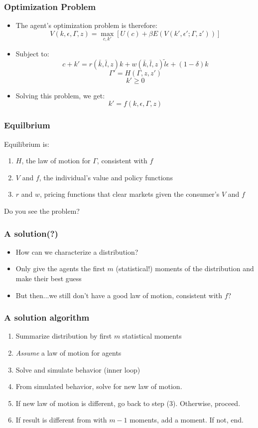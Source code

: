 \documentclass{beamer}
\begin{document}
\begin{frame}
\frametitle[alignment=center]{Optimization Problem}
\begin{itemize}
\item The agent's optimization problem is therefore:
$$V(k,\epsilon,\Gamma,z)=\underset{c,k'}{\max}\left[U(c)+\beta E(V(k',\epsilon';\Gamma,z'))\right]$$
\item Subject to:
$$c+k'=r(\bar{k},\bar{l},z)k+w(\bar{k},\bar{l},z)\tilde{l}\epsilon+(1-\delta)k$$
$$\Gamma'=H(\Gamma,z,z')$$
$$k'\geq 0$$
\item Solving this problem, we get:
$$k'=f(k,\epsilon,\Gamma,z)$$
\end{itemize}
\end{frame}

\begin{frame}
\frametitle[alignment=center]{Equilbrium}
Equilibrium is:
\begin{enumerate}
\item $H$, the law of motion for $\Gamma$, consistent with $f$
\bigskip
\item $V$ and $f$, the individual's value and policy functions
\bigskip
\item $r$ and $w$, pricing functions that clear markets given the consumer's $V$ and $f$
\end{enumerate}
Do you see the problem?
\end{frame}

\begin{frame}
\frametitle[alignment=center]{A solution(?)}
\begin{itemize}
\item How can we characterize a distribution?
\bigskip
\item Only give the agents the first $m$ (statistical!) moments of the distribution and make their best guess
\bigskip
\item But then...we still don't have a good law of motion, consistent with $f$?
\end{itemize}
\end{frame}

\begin{frame}
\frametitle[alignment=center]{A solution algorithm}
\begin{enumerate}
\item Summarize distribution by first $m$ statistical moments
\bigskip
\item \emph{Assume} a law of motion for agents
\bigskip
\item Solve and simulate behavior (inner loop)
\bigskip
\item From simulated behavior, solve for new law of motion.  
\bigskip
\item If new law of motion is different, go back to step (3).  Otherwise, proceed. 
\bigskip
\item If result is different from with $m-1$ moments, add a moment.  If not, end.
\end{enumerate}
\end{frame}
\end{document}
